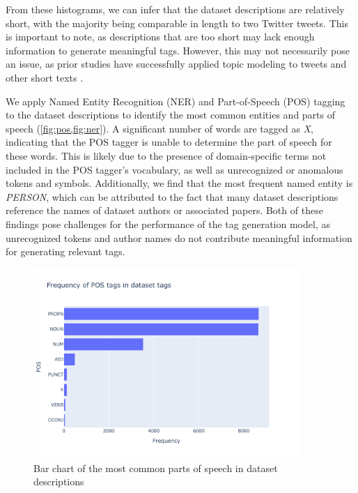 From these histograms, we can infer that the dataset descriptions are relatively short, with the majority being comparable in length to two Twitter tweets. This is important to note, as descriptions that are too short may lack enough information to generate meaningful tags. However, this may not necessarily pose an issue, as prior studies have successfully applied topic modeling to tweets and other short texts \cite{cataldi_emerging_2010, churchill_percolation-based_2020, curiskis_evaluation_2020, kasiviswanathan_emerging_2011, paul_discovering_2014, yin_dirichlet_2014}.

We apply Named Entity Recognition (NER) and Part-of-Speech (POS) tagging to the dataset descriptions to identify the most common entities and parts of speech (\cref{fig:pos,fig:ner}). A significant number of words are tagged as \textit{X}, indicating that the POS tagger is unable to determine the part of speech for these words. This is likely due to the presence of domain-specific terms not included in the POS tagger's vocabulary, as well as unrecognized or anomalous tokens and symbols. Additionally, we find that the most frequent named entity is \textit{PERSON}, which can be attributed to the fact that many dataset descriptions reference the names of dataset authors or associated papers. Both of these findings pose challenges for the performance of the tag generation model, as unrecognized tokens and author names do not contribute meaningful information for generating relevant tags.

\begin{figure}[h]
    \centering
    \includegraphics[width=0.9\textwidth]{figures/pos.pdf}
    \caption{Bar chart of the most common parts of speech in dataset descriptions}
    \label{fig:pos}
\end{figure}

